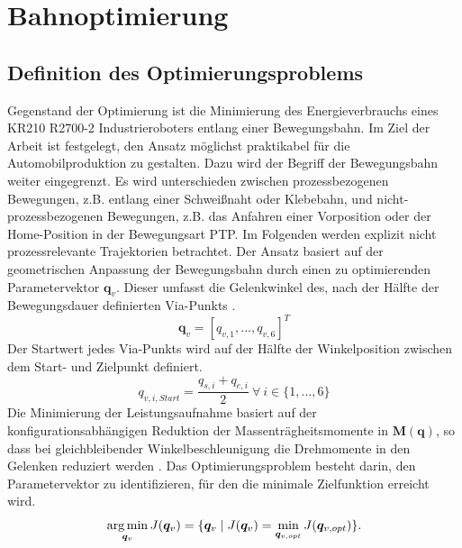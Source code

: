 \chapter{Bahnoptimierung}
%
\section{Definition des Optimierungsproblems}
Gegenstand der Optimierung ist die Minimierung des Energieverbrauchs eines KR210 R2700-2 Industrieroboters entlang einer Bewegungsbahn. Im Ziel der Arbeit ist festgelegt, den Ansatz möglichst praktikabel für die Automobilproduktion zu gestalten. Dazu wird der Begriff der Bewegungsbahn weiter eingegrenzt. Es wird unterschieden zwischen prozessbezogenen Bewegungen, z.B. entlang einer Schweißnaht oder Klebebahn, und nicht-prozessbezogenen Bewegungen, z.B. das Anfahren einer Vorposition oder der Home-Position in der Bewegungsart PTP. Im Folgenden werden explizit nicht prozessrelevante Trajektorien betrachtet. Der Ansatz basiert auf der geometrischen Anpassung  der Bewegungsbahn durch einen zu optimierenden Parametervektor $\bm{q}_{v}$. Dieser umfasst die Gelenkwinkel des, nach der Hälfte der Bewegungsdauer definierten Via-Punkts \cite[S~532~ f.]{Ziaukas.2017}.
%
\begin{equation}
	\label{eqn:parametervektor}
	\bm{q}_{v} = [q_{v,1},...,q_{v,6}]^T 
\end{equation}
%
Der Startwert jedes Via-Punkts wird auf der Hälfte der Winkelposition zwischen dem Start- und Zielpunkt definiert.
\begin{equation}
	\label{eqn:parametervektor-startkonfiguration}
	q_{v,i,Start} = \dfrac{q_{s,i}+q_{e,i}}{2} ~\forall~ i \in \{1,...,6\}
\end{equation}
Die Minimierung der Leistungsaufnahme basiert auf der konfigurationsabhängigen Reduktion der Massenträgheitsmomente in $\bm{M}(\bm{q})$, so dass bei gleichbleibender Winkelbeschleunigung die Drehmomente in den Gelenken reduziert werden \cite[S.~531]{Ziaukas.2017}. Das Optimierungsproblem besteht darin, den Parametervektor zu identifizieren, für den die minimale Zielfunktion erreicht wird.
%
\begin{equation}
	\operatorname*{arg\,min}_{\bm{q}_{v}} J(\bm{q}_{v}) = \{\bm{q}_{v} \mid J(\bm{q}_{v}) = \min_{\bm{q}_{v,opt}} J(\bm{q}_{v,opt})\}.
\end{equation}
%
